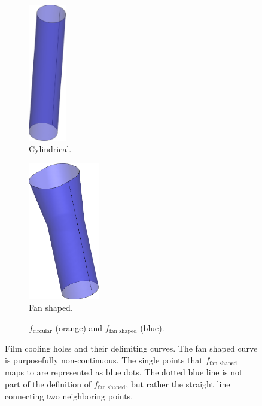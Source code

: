 \documentclass[a4paper, 11pt]{report}
\theoremstyle{definition}
\begin{document}
	\begin{figure}[H]
		\centering
		\begin{subfigure}{.15\textwidth}
			\includegraphics[height=6cm]{../tec/holes/16.png}
			\vspace{1.5cm}
			\caption{Cylindrical.}
		\end{subfigure}
		\phantom{aa}
		\begin{subfigure}{.19\textwidth}
			\includegraphics[height=6cm]{../tec/holes/15.png}
			\vspace{1.1cm}
			\caption{Fan shaped.}
		\end{subfigure}
		\begin{subfigure}{.55\textwidth}
			
			\caption{$f_\textrm{circular}$ (orange) and $f_\textrm{fan shaped}$ (blue).}
		\end{subfigure}
		\caption{Film cooling holes and their delimiting curves. The fan shaped curve is purposefully non-continuous. The single points that $f_\textrm{fan shaped}$ maps to are represented as blue dots. The dotted blue line is not part of the definition of $f_\textrm{fan shaped}$, but rather the straight line connecting two neighboring points.}
		\label{fig:filmholes}
	\end{figure}
\end{document}
